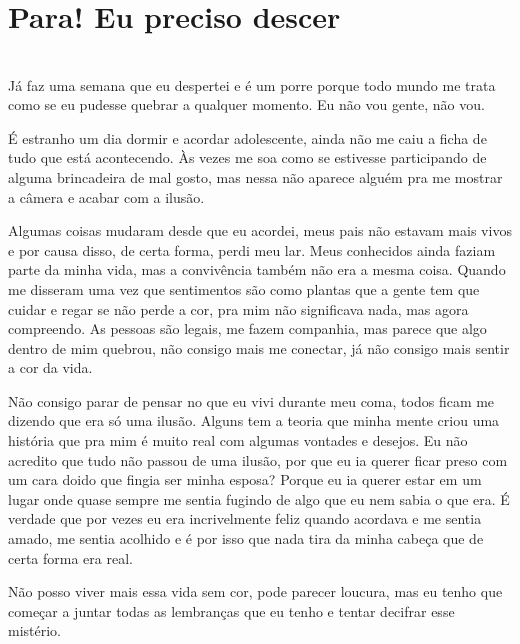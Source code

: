 \newpage

\ifdefined\useChapters
\chapter{Para! Eu preciso descer}
\else
\chapter{}
\fi

Já faz uma semana que eu despertei e é um porre porque todo mundo me trata como se eu pudesse quebrar a qualquer momento. Eu não vou gente, não vou.

É estranho um dia dormir e acordar adolescente, ainda não me caiu a ficha de tudo que está acontecendo. Às vezes me soa como se estivesse participando de alguma brincadeira de mal gosto, mas nessa não aparece alguém pra me mostrar a câmera e acabar com a ilusão.

Algumas coisas mudaram desde que eu acordei, meus pais não estavam mais vivos e por causa disso, de certa forma, perdi meu lar. Meus conhecidos ainda faziam parte da minha vida, mas a convivência também não era a mesma coisa. Quando me disseram uma vez que sentimentos são como plantas que a gente tem que cuidar e regar se não perde a cor, pra mim não significava nada, mas agora compreendo. As pessoas são legais, me fazem companhia, mas parece que algo dentro de mim quebrou, não consigo mais me conectar, já não consigo mais sentir a cor da vida.

Não consigo parar de pensar no que eu vivi durante meu coma, todos ficam me dizendo que era só uma ilusão. Alguns tem a teoria que minha mente criou uma história que pra mim é muito real com algumas vontades e desejos. Eu não acredito que tudo não passou de uma ilusão, por que eu ia querer ficar preso com um cara doido que fingia ser minha esposa? Porque eu ia querer estar em um lugar onde quase sempre me sentia fugindo de algo que eu nem sabia o que era. É verdade que por vezes eu era incrivelmente feliz quando acordava e me sentia amado, me sentia acolhido e é por isso que nada tira da minha cabeça que de certa forma era real.

Não posso viver mais essa vida sem cor, pode parecer loucura, mas eu tenho que começar a juntar todas as lembranças que eu tenho e tentar decifrar esse mistério.

